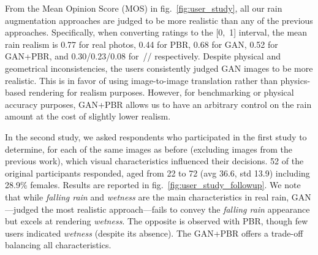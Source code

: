 From the Mean Opinion Score (MOS) in fig.~\ref{fig:user_study}, all our rain augmentation approaches are judged to be more realistic than any of the previous approaches. 
Specifically, when converting ratings to the [0,~1] interval, the mean rain realism is 0.77 for real photos, 0.44 for PBR, 0.68 for GAN, 0.52 for GAN+PBR, and 0.30/0.23/0.08 for~\cite{zhang2018density}/\cite{zhang2019image}/\cite{yang2017deep} respectively.
Despite physical and geometrical inconsistencies, the users consistently judged GAN images to be more realistic. This is in favor of using image-to-image translation rather than physics-based rendering for realism purposes.
However, for benchmarking or physical accuracy purposes, GAN+PBR allows us to have an arbitrary control on the rain amount at the cost of slightly lower realism.

In the second study, we asked respondents who participated in the first study to determine, for each of the same images as before (excluding images from the previous work), which visual characteristics influenced their decisions. 52 of the original participants responded, aged from 22 to 72 (avg 36.6, std 13.9) including 28.9\% females. 
Results are reported in fig.~\ref{fig:user_study_followup}.
We note that while \textit{falling rain} and \textit{wetness} are the main characteristics in real rain, GAN---judged the most realistic approach---fails to convey the \textit{falling rain} appearance but excels at rendering \textit{wetness}. The opposite is observed with PBR, though few users indicated \textit{wetness} (despite its absence). The GAN+PBR offers a trade-off balancing all characteristics. 
